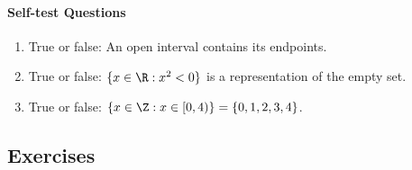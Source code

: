 \paragraph{Self-test Questions}

\begin{enumerate}
  \item True or false: An open interval contains its endpoints.
  \item True or false: $\{x\in\R:x^2<0\}$ is a representation of the empty set.
  \item True or false: $\{x\in\Z:x\in[0,4)\}=\{0,1,2,3,4\}$.
\end{enumerate}


\subsection*{Exercises}

